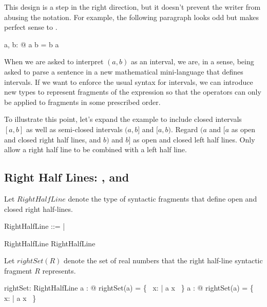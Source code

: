 \documentclass[11pt, oneside]{article}
\begin{document}
This design is a step in the right direction, but it doesn't prevent the writer from abusing the notation.
For example, the following paragraph looks odd but makes perfect sense to \fuzz.

\begin{zed}
	\forall a, b: \R @ \lowerBound a \intersect b \upperBound = b \upperBound \intersect \lowerBound a 
\end{zed}

When we are asked to interpret $(a,b)$ as an interval, we are, in a sense, being asked to parse a sentence
in a new mathematical mini-language that defines intervals.
If we want to enforce the usual syntax for intervals,
we can introduce new types to represent fragments of the expression so that the operators can only be applied to
fragments in some prescribed order.

To illustrate this point, let's expand the example to include closed intervals $[a,b]$ as well as semi-closed intervals
$(a,b]$ and $[a,b)$.
Regard $(a$ and $[a$ as open and closed right half lines, and $b)$ and $b]$ as open and closed left half lines.
Only allow a right half line to be combined with a left half line.

\subsection{Right Half Lines: , and }

Let $RightHalfLine$ denote the type of syntactic fragments that define open and closed right half-lines.

\begin{zed}
	RightHalfLine ::= \openLowerBound \ldata \R \rdata | \closedLowerBound \ldata \R \rdata
\end{zed}

\begin{example}

\begin{zed}
	\openLowerBound \zeroR \in RightHalfLine
\also
	\closedLowerBound \oneR \in RightHalfLine
\end{zed}

\end{example}

Let $rightSet(R)$ denote the set of real numbers that the right half-line syntactic fragment $R$ represents.

\begin{axdef}
	rightSet: RightHalfLine \fun \power \R
\where
	\forall a : \R @ rightSet(\openLowerBound a) = \{~ x: \R | a \ltR x ~\}
\also
	\forall a : \R @ rightSet(\closedLowerBound a) = \{~ x: \R | a \leR x ~\}
\end{axdef}
\end{document}
